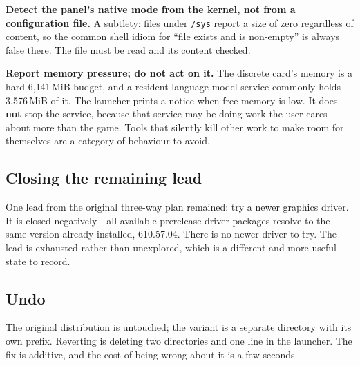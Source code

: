 \textbf{Detect the panel's native mode from the kernel, not from a
configuration file.} A subtlety: files under \verb|/sys| report a size of zero
regardless of content, so the common shell idiom for ``file exists and is
non-empty'' is always false there. The file must be read and its content checked.

\textbf{Report memory pressure; do not act on it.} The discrete card's memory is
a hard 6{,}141\,MiB budget, and a resident language-model service commonly holds
3{,}576\,MiB of it. The launcher prints a notice when free memory is low. It does
\textbf{not} stop the service, because that service may be doing work the user
cares about more than the game. Tools that silently kill other work to make room
for themselves are a category of behaviour to avoid.

\subsection{Closing the remaining lead}

One lead from the original three-way plan remained: try a newer graphics driver.
It is closed negatively---all available prerelease driver packages resolve to the
same version already installed, 610.57.04. There is no newer driver to try. The
lead is exhausted rather than unexplored, which is a different and more useful
state to record.

\subsection{Undo}

The original distribution is untouched; the variant is a separate directory with
its own prefix. Reverting is deleting two directories and one line in the
launcher. The fix is additive, and the cost of being wrong about it is a few
seconds.

